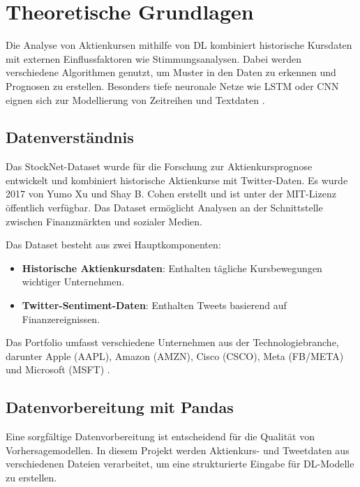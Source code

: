 
\newpage
\section{Theoretische Grundlagen}\label{sec:theorie}

Die Analyse von Aktienkursen mithilfe von \ac{DL} kombiniert historische Kursdaten mit externen Einflussfaktoren wie Stimmungsanalysen. Dabei werden verschiedene Algorithmen genutzt, um Muster in den Daten zu erkennen und Prognosen zu erstellen. Besonders tiefe neuronale Netze wie \ac{LSTM} oder \ac{CNN} eignen sich zur Modellierung von Zeitreihen und Textdaten \autocite{goodfellow2016deep}\autocite{hochreiter1997long}.

\subsection{Datenverständnis}\label{sec:theorie_data_understanding}

Das StockNet-Dataset wurde für die Forschung zur Aktienkursprognose entwickelt und kombiniert historische Aktienkurse mit Twitter-Daten. Es wurde 2017 von Yumo Xu und Shay B. Cohen erstellt und ist unter der MIT-Lizenz öffentlich verfügbar. Das Dataset ermöglicht Analysen an der Schnittstelle zwischen Finanzmärkten und sozialer Medien.

Das Dataset besteht aus zwei Hauptkomponenten:
\begin{itemize}
	\item \textbf{Historische Aktienkursdaten}: Enthalten tägliche Kursbewegungen wichtiger Unternehmen.
	\item \textbf{Twitter-Sentiment-Daten}: Enthalten Tweets basierend auf Finanzereignissen.
\end{itemize}

Das Portfolio umfasst verschiedene Unternehmen aus der Technologiebranche, darunter Apple (AAPL), Amazon (AMZN), Cisco (CSCO), Meta (FB/META) und Microsoft (MSFT) \autocite{xu2018StockMovement}\autocite{chen2018StockNet}.


\subsection{Datenvorbereitung mit Pandas}\label{sec:datenvorbereitung_pandas}

Eine sorgfältige Datenvorbereitung ist entscheidend für die Qualität von Vorhersagemodellen. In diesem Projekt werden Aktienkurs- und Tweetdaten aus verschiedenen Dateien verarbeitet, um eine strukturierte Eingabe für \ac{DL}-Modelle zu erstellen.

